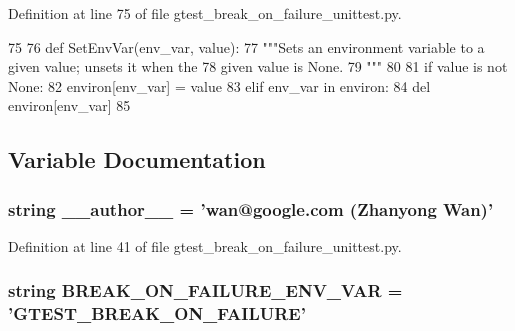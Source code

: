 \-Definition at line 75 of file gtest\-\_\-break\-\_\-on\-\_\-failure\-\_\-unittest.\-py.


\begin{DoxyCode}
75 
76 def SetEnvVar(env_var, value):
77   """Sets an environment variable to a given value; unsets it when the
78   given value is None.
79   """
80 
81   if value is not None:
82     environ[env_var] = value
83   elif env_var in environ:
84     del environ[env_var]
85 

\end{DoxyCode}


\subsection{\-Variable \-Documentation}
\hypertarget{namespacegtest__break__on__failure__unittest_a629d61dfe4da763164a4d1a2d85b0afd}{
\subsubsection[{\-\_\-\-\_\-author\-\_\-\-\_\-}]{\setlength{\rightskip}{0pt plus 5cm}string {\bf \-\_\-\-\_\-author\-\_\-\-\_\-} = 'wan@google.\-com (\-Zhanyong \-Wan)'}}\label{d2/dcc/namespacegtest__break__on__failure__unittest_a629d61dfe4da763164a4d1a2d85b0afd}


\-Definition at line 41 of file gtest\-\_\-break\-\_\-on\-\_\-failure\-\_\-unittest.\-py.

\hypertarget{namespacegtest__break__on__failure__unittest_a0f8ac0a1e414f3870fcb60f000f56dc6}{
\subsubsection[{\-B\-R\-E\-A\-K\-\_\-\-O\-N\-\_\-\-F\-A\-I\-L\-U\-R\-E\-\_\-\-E\-N\-V\-\_\-\-V\-A\-R}]{\setlength{\rightskip}{0pt plus 5cm}string {\bf \-B\-R\-E\-A\-K\-\_\-\-O\-N\-\_\-\-F\-A\-I\-L\-U\-R\-E\-\_\-\-E\-N\-V\-\_\-\-V\-A\-R} = '\-G\-T\-E\-S\-T\-\_\-\-B\-R\-E\-A\-K\-\_\-\-O\-N\-\_\-\-F\-A\-I\-L\-U\-R\-E'}}\label{d2/dcc/namespacegtest__break__on__failure__unittest_a0f8ac0a1e414f3870fcb60f000f56dc6}


